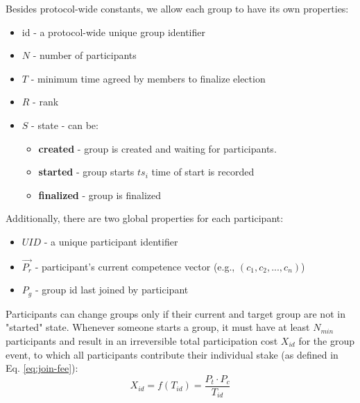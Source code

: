 \documentclass{article}
\begin{document}
\begin{CJK}{UTF8}{gbsn}
    Besides protocol-wide constants, we allow each group to have its own properties:

    \begin{itemize}[nosep]
        \item id - a protocol-wide unique group identifier
        \item $N$ - number of participants
        \item $T$ - minimum time agreed by members to finalize election
        \item $R$ - rank
        \item $S$ - state - can be:
              \begin{itemize}[nosep]
                  \item \textbf{created} - group is created and waiting for participants.
                  \item \textbf{started} - group starts $ts_i$ time of start is recorded
                  \item \textbf{finalized} - group is finalized
              \end{itemize}
    \end{itemize}

    Additionally, there are two global properties for each participant:

    \begin{itemize}[nosep]
        \item  $UID$ - a unique participant identifier
        \item  $\vec{P_r}$ - participant's current competence vector (e.g., $(c_1, c_2, ..., c_n)$)
        \item $P_g$ - group id last joined by participant
    \end{itemize}

    Participants can change groups only if their current and target group are not in "started" state. Whenever someone starts a group, it must have at least $N_{min}$ participants and result in an irreversible total participation cost $X_{id}$ for the group event, to which all participants contribute their individual stake (as defined in Eq. \ref{eq:join-fee}):
    \begin{equation}
        \label{eq:group-fee}
        X_{id} = f(T_{id}) = \dfrac{P_t \cdot  P_c }{T_{id}}
    \end{equation}


\end{CJK}
\end{document}
